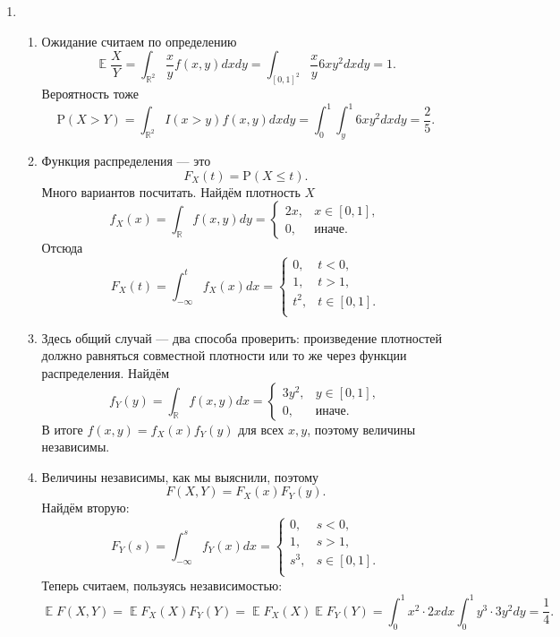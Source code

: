 \documentclass[12pt]{article}
\newcommand{\Proba}[1]{\mathrm{P}\left( #1 \right)}
\DeclareMathOperator{\E}{\mathbb{E}}
\newcommand{\RR}{\mathbb{R}}
\begin{document}
\begin{enumerate}
    
    \item 

    \begin{enumerate}
        \item Ожидание считаем по определению
        \[
        \E{\frac{X}{Y}} = \int_{\RR^2} \frac{x}{y}f(x,y) dxdy = \int_{[0,1]^2} \frac{x}{y} 6xy^2 dxdy = 1.
        \]
        Вероятность тоже
        \[
        \Proba{X > Y} = \int_{\RR^2} I(x>y)f(x,y) dxdy = \int_0^1 \int_y^1  6xy^2 dx dy = \frac{2}{5}.
        \]
        \item Функция распределения — это
        \[
        F_X(t) = \Proba{X \leq t}.
        \]
        Много вариантов посчитать. Найдём плотность $X$
        \[
        f_X(x) = \int_{\RR} f(x,y)dy = \begin{cases} 2x, & x \in [0,1],\\ 0, & \text{иначе}. \end{cases}
        \]
        Отсюда
        \[
        F_X(t) = \int_{-\infty}^t f_X(x) dx = \begin{cases} 0, & t<0,\\ 1, & t>1,\\ t^2, & t \in [0,1].\\   \end{cases}
        \]
        \item Здесь общий случай — два способа проверить: произведение плотностей должно равняться совместной плотности или то же через функции распределения. Найдём
        \[
        f_Y(y) = \int_{\RR} f(x,y)dx = \begin{cases} 3y^2, & y \in [0,1],\\ 0, & \text{иначе}. \end{cases}
        \]
        В итоге $f(x,y)=f_X(x)f_Y(y)$ для всех $x,y$, поэтому величины независимы.
        
        \item  Величины независимы, как мы выяснили, поэтому
        \[
        F(X,Y) = F_X(x)F_Y(y).
        \]
        Найдём вторую:
        \[
        F_Y(s) = \int_{-\infty}^s f_Y(x) dx = \begin{cases} 0, & s<0,\\ 1, & s>1,\\ s^3, & s \in [0,1].\\   \end{cases}
        \]
        Теперь считаем, пользуясь независимостью:
        \[
        \E{F(X,Y)} =\E{F_X(X) F_Y(Y)} = \E{F_X(X)} \E{F_Y(Y)} = \int_0^1 x^2 \cdot 2x dx \int_0^1 y^3 \cdot 3y^2 dy = \frac{1}{4}.
        \]
    \end{enumerate}
    


\end{enumerate}
\end{document}
